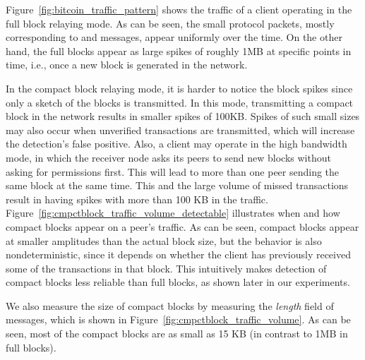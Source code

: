 Figure~\ref{fig:bitcoin_traffic_pattern} shows the traffic of a \bc client operating in the full block relaying mode.
As can be seen, the small protocol packets, mostly corresponding to  and  messages, appear 
uniformly over the time. 
On the other hand, the \bc full blocks appear as large spikes of roughly 1MB at specific points in time, i.e., once a new block is generated in the network. 

In the compact block relaying mode, it is harder to notice the block spikes 
since only a sketch of the blocks is transmitted. In this mode, transmitting a compact block in the network results in smaller spikes of 100KB. Spikes of such small sizes may also occur when unverified transactions are transmitted, which will increase the detection's false positive. Also, a \bc client may operate in the high bandwidth mode, in which the receiver node  asks its peers to send new blocks without asking for permissions first. This will lead to more than one peer sending the same block at the same time. This and the large volume of missed transactions result in having spikes with more than 100 KB in the traffic. 
Figure~\ref{fig:cmpctblock_traffic_volume_detectable} illustrates  when and how
compact blocks appear on a peer's traffic. As can be seen, compact blocks appear at
smaller amplitudes than the actual block size, but the behavior is also nondeterministic,
since it depends on whether the client has previously received some of the transactions
in that block. This intuitively makes detection of compact blocks less reliable than full blocks, as shown later in our experiments. 

We also measure the size of compact blocks by measuring the 
\textit{length} field of  messages, which is shown in Figure~\ref{fig:cmpctblock_traffic_volume}. 
As can be seen, most of the compact blocks are as small as 15 KB (in contrast to 1MB in full blocks). 


